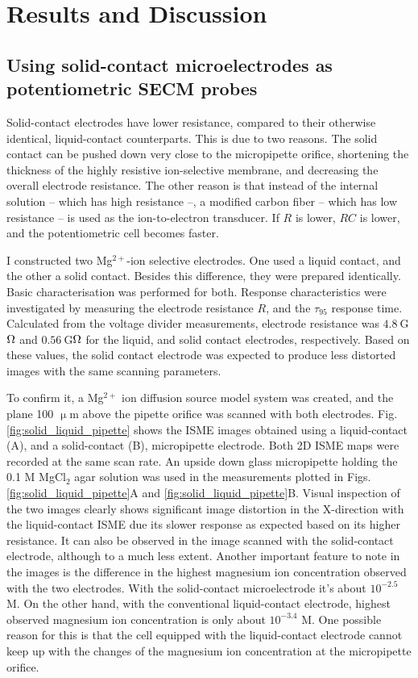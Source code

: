 \section{Results and Discussion}
\subsection{Using solid-contact microelectrodes as potentiometric SECM probes}
Solid-contact electrodes have lower resistance, compared to their otherwise identical, liquid-contact counterparts.
This is due to two reasons.
The solid contact can be pushed down very close to the micropipette orifice, shortening the thickness of the highly resistive ion-selective membrane, and decreasing the overall electrode resistance.
The other reason is that instead of the internal solution -- which has high resistance --, a modified carbon fiber -- which has low resistance -- is used as the ion-to-electron transducer.
If $R$ is lower, $RC$ is lower, and the potentiometric cell becomes faster.

I constructed two Mg$^{2+}$-ion selective electrodes.
One used a liquid contact, and the other a solid contact.
Besides this difference, they were prepared identically.
Basic characterisation was performed for both.
Response characteristics were investigated by measuring the electrode resistance $R$, and the $\tau_{95}$ response time.
Calculated from the voltage divider measurements, electrode resistance was $4.8~$G$\ohm$ and $0.56~$G$\ohm$ for the liquid, and solid contact electrodes, respectively.
Based on these values, the solid contact electrode was expected to produce less distorted images with the same scanning parameters.

To confirm it, a Mg$^{2+}$ ion diffusion source model system was created, and the plane 100 $\upmu$m above the pipette orifice was scanned with both electrodes.
Fig. \ref{fig:solid_liquid_pipette} shows the ISME images obtained using a liquid-contact (A), and a solid-contact (B), micropipette electrode.
Both 2D ISME maps were recorded at the same scan rate.
An upside down glass micropipette holding the 0.1 M MgCl$_2$ agar solution was used in the measurements plotted in Figs. \ref{fig:solid_liquid_pipette}A and \ref{fig:solid_liquid_pipette}B.
Visual inspection of the two images clearly shows significant image distortion in the X-direction with the liquid-contact ISME due its slower response as expected based on its higher resistance.
It can also be observed in the image scanned with the solid-contact electrode, although to a much less extent.
Another important feature to note in the images is the difference in the highest magnesium ion concentration observed with the two electrodes.
With the solid-contact microelectrode it's about $10^{-2.5}$ M.
On the other hand, with the conventional liquid-contact electrode, highest observed magnesium ion concentration is only about $10^{-3.4}$ M.
One possible reason for this is that the cell equipped with the liquid-contact electrode cannot keep up with the changes of the magnesium ion concentration at the micropipette orifice.

